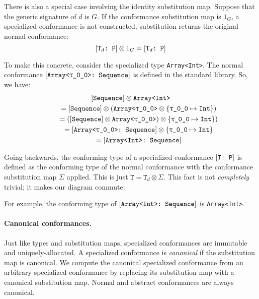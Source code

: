 \documentclass[../generics]{subfiles}
\begin{document}
There is also a special case involving the identity substitution map. Suppose that the generic signature of $d$ is $G$. If the conformance substitution map is $1_G$, a specialized conformance is not constructed; substitution returns the original normal conformance:
\[
[\texttt{$\texttt{T}_d$:~P}] \otimes 1_G = [\texttt{$\texttt{T}_d$:~P}]
\]

To make this concrete, consider the specialized type \texttt{Array<Int>}. The normal conformance $\ConfReq{Array<\ttgp{0}{0}>}{Sequence}$ is defined in the standard library. So, we have:
\begin{gather*}
\protosym{Sequence}\otimes\texttt{Array<Int>}\\
\qquad {} = \protosym{Sequence}\otimes(\texttt{Array<\ttgp{0}{0}>}\otimes\SubstMap{\SubstType{\ttgp{0}{0}}{Int}})\\
\qquad {} = (\protosym{Sequence}\otimes\texttt{Array<\ttgp{0}{0}>})\otimes\SubstMap{\SubstType{\ttgp{0}{0}}{Int}})\\
\qquad {} = \ConfReq{Array<\ttgp{0}{0}>}{Sequence}\otimes\SubstMap{\SubstType{\ttgp{0}{0}}{Int}}\\
\qquad {} = \ConfReq{Array<Int>}{Sequence}
\end{gather*}

Going backwards, the conforming type of a specialized conformance $[\texttt{T:~P}]$ is defined as the conforming type of the normal conformance with the conformance substitution map $\Sigma$ applied. This is just $\texttt{T}=\texttt{T}_d\otimes\Sigma$. This fact is not \emph{completely} trivial; it makes our diagram commute:
\begin{quote}
\end{quote}
For example, the conforming type of $[\texttt{Array<Int>:~Sequence}]$ is \texttt{Array<Int>}.

\paragraph{Canonical conformances.}
Just like types and substitution maps, specialized conformances are immutable and uniquely-allocated. A specialized conformance is \emph{canonical} if the substitution map is canonical. We compute the canonical specialized conformance from an arbitrary specialized conformance by replacing its substitution map with a canonical substitution map. Normal and abstract conformances are always canonical.
\end{document}
